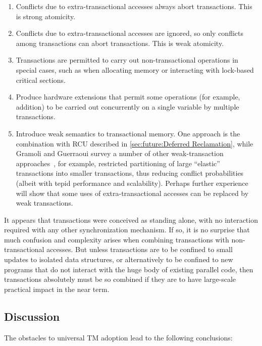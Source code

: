 \begin{enumerate}
\item	Conflicts due to extra-transactional accesses always abort
	transactions.
	This is strong atomicity.
\item	Conflicts due to extra-transactional accesses are ignored,
	so only conflicts among transactions can abort transactions.
	This is weak atomicity.
\item	Transactions are permitted to carry out non-transactional
	operations in special cases, such as when allocating memory or
	interacting with lock-based critical sections.
\item	Produce hardware extensions that permit some operations
	(for example, addition) to be carried out concurrently on a
	single variable by multiple transactions.
\item	Introduce weak semantics to transactional memory.
	One approach is the combination with RCU described in
	\cref{sec:future:Deferred Reclamation},
	while Gramoli and Guerraoui
	survey a number of other weak-transaction
	approaches~\cite{Gramoli:2014:DTP:2541883.2541900}, for example,
	restricted partitioning of large
	``elastic'' transactions into smaller transactions, thus
	reducing conflict probabilities (albeit with tepid performance
	and scalability).
	Perhaps further experience will show that some uses of
	extra-transactional accesses can be replaced by weak
	transactions.
\end{enumerate}

It appears that transactions were conceived as standing alone, with no
interaction required with any other synchronization mechanism.
If so, it is no surprise that much confusion and complexity arises when
combining transactions with non-transactional accesses.
But unless transactions are to be confined to small updates to isolated
data structures, or alternatively to be confined to new programs
that do not interact with the huge body of existing parallel code,
then transactions absolutely must be so combined if they are to have
large-scale practical impact in the near term.


\subsection{Discussion}
\label{sec:future:Discussion}

The obstacles to universal TM adoption lead to the following
conclusions:

